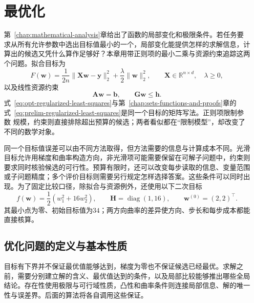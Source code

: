 \chapter{最优化}
\label{chap:optimization}

第~\ref{chap:mathematical-analysis}章给出了函数的局部变化和极限条件。若任务要求从所有允许参数中选出目标值最小的一个，局部变化能提供怎样的求解信息，计算出的候选又凭什么算作足够好？本章用带正则项的最小二乘与资源约束追踪这两个问题。拟合目标为
\begin{equation}
  F(\bm{w})
  =
  \frac{1}{2n}\lVert \bm{X}\bm{w}-\bm{y}\rVert_2^2
  +\frac{\lambda}{2}\lVert\bm{w}\rVert_2^2,
  \qquad
  \bm{X}\in\mathbb{R}^{n\times d},\quad \lambda\geq 0,
  \label{eq:opt-regularized-least-squares}
\end{equation}
以及线性资源约束
\begin{equation}
  \bm{A}\bm{w}=\bm{b},\qquad
  \bm{G}\bm{w}\leq\bm{h}.
  \label{eq:opt-linear-resource-constraints}
\end{equation}
式~\eqref{eq:opt-regularized-least-squares}与第~\ref{chap:sets-functions-and-proofs}章的
式~\eqref{eq:prelim-regularized-least-squares}是同一个目标的矩阵写法。正则项限制参数
规模，约束则直接排除超出预算的候选；两者看似都在“限制模型”，却改变了不同的数学对象。

同一个目标值误差可以由不同方法取得，但方法需要的信息与计算成本不同。光滑目标允许用梯度和曲率构造方向，非光滑项可能需要保留在可解子问题中，约束则要求同时核验候选的可行性。预算有限时，还可以改变每步读取的信息、变量范围或子问题精度；多个评价目标则需要另行规定怎样选择答案。这些条件可以同时出现。为了固定比较口径，除拟合与资源例外，还使用以下二次目标
\begin{equation}
 f(\bm w)=\frac12(w_1^2+16w_2^2),\qquad
 \bm H=\operatorname{diag}(1,16),\qquad
 \bm w^{(0)}=(2,2)^\top.
 \label{eq:opt-common-quadratic}
\end{equation}
其最小点为零、初始目标值为$34$；两方向曲率的差异使方向、步长和每步成本都能直接核算。

\section{优化问题的定义与基本性质}
\label{sec:opt-objectives-solutions-curvature}

目标有下界并不保证最优值能够达到，梯度为零也不保证候选已经最优。求解之前，需要分别建立解的含义、最优值达到的条件，以及局部比较能够推出哪些全局结论。存在性使用极限与可行域性质，凸性和曲率条件则连接局部信息、解的唯一性与误差界。后面的算法将各自调用这些保证。

